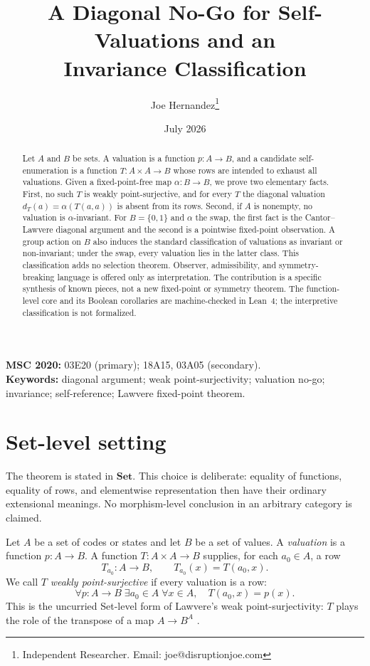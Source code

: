 \documentclass[11pt]{article}
\title{A Diagonal No-Go for Self-Valuations and an\\ Invariance Classification}
\author{Joe Hernandez\thanks{Independent Researcher. Email: joe@disruptionjoe.com}}
\date{July 2026}
\theoremstyle{definition}
\theoremstyle{remark}
\begin{document}
\maketitle

\begin{abstract}
Let $A$ and $B$ be sets. A valuation is a function $p\colon A\to B$, and a candidate self-enumeration is a function $T\colon A\times A\to B$ whose rows are intended to exhaust all valuations. Given a fixed-point-free map $\alpha\colon B\to B$, we prove two elementary facts. First, no such $T$ is weakly point-surjective, and for every $T$ the diagonal valuation $d_T(a)=\alpha(T(a,a))$ is absent from its rows. Second, if $A$ is nonempty, no valuation is $\alpha$-invariant. For $B=\{0,1\}$ and $\alpha$ the swap, the first fact is the Cantor--Lawvere diagonal argument and the second is a pointwise fixed-point observation. A group action on $B$ also induces the standard classification of valuations as invariant or non-invariant; under the swap, every valuation lies in the latter class. This classification adds no selection theorem. Observer, admissibility, and symmetry-breaking language is offered only as interpretation. The contribution is a specific synthesis of known pieces, not a new fixed-point or symmetry theorem. The function-level core and its Boolean corollaries are machine-checked in Lean~4; the interpretive classification is not formalized.
\end{abstract}

\noindent\textbf{MSC 2020:} 03E20 (primary); 18A15, 03A05 (secondary).\\
\textbf{Keywords:} diagonal argument; weak point-surjectivity; valuation no-go; invariance; self-reference; Lawvere fixed-point theorem.

\section{Set-level setting}
\label{sec:setting}

The theorem is stated in $\mathbf{Set}$. This choice is deliberate: equality of functions, equality of rows, and elementwise representation then have their ordinary extensional meanings. No morphism-level conclusion in an arbitrary category is claimed.

Let $A$ be a set of codes or states and let $B$ be a set of values. A \emph{valuation} is a function $p\colon A\to B$. A function $T\colon A\times A\to B$ supplies, for each $a_0\in A$, a row
\[
T_{a_0}\colon A\to B,\qquad T_{a_0}(x)=T(a_0,x).
\]
We call $T$ \emph{weakly point-surjective} if every valuation is a row:
\[
\forall p\colon A\to B\;\exists a_0\in A\;\forall x\in A,
\quad T(a_0,x)=p(x).
\]
This is the uncurried Set-level form of Lawvere's weak point-surjectivity: $T$ plays the role of the transpose of a map $A\to B^A$ \cite{lawvere1969,yanofsky2003}.
\end{document}
